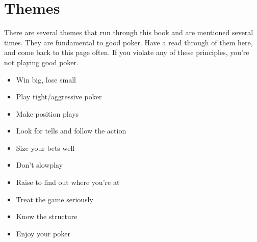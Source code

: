 \chapter{Themes}


There are several themes that run through this book and are mentioned
several times. They are fundamental to good poker. Have a read through
of them here, and come back to this page often. If you violate any of
these principles, you're not playing good poker.

\begin{itemize}
  \item Win big, lose small
  \item Play tight/aggressive poker
  \item Make position plays
  \item Look for tells and follow the action
  \item Size your bets well
  \item Don't slowplay
  \item Raise to find out where you're at
  \item Treat the game seriously
  \item Know the structure
  \item Enjoy your poker
\end{itemize}

